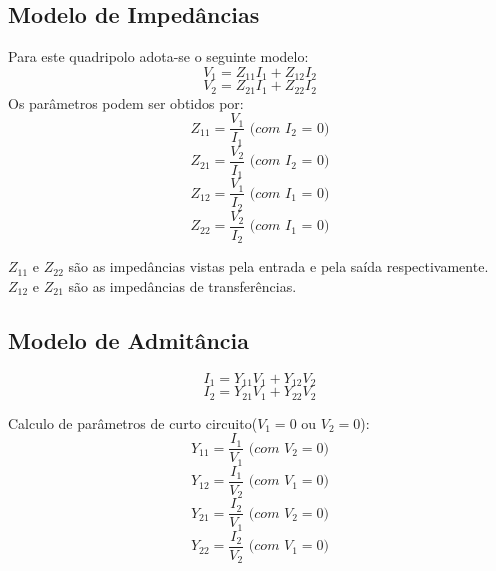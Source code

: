 \documentclass[a4paper, 12pt]{article}
\begin{document}
	\subsection{Modelo de Impedâncias}
	Para este quadripolo adota-se o seguinte modelo:
	\begin{equation}
		V_1 = Z_{11}I_1 + Z_{12}I_2
		\label{quadmod1}
	\end{equation}
	\begin{equation}
		V_2 = Z_{21}I_1 + Z_{22}I_2
		\label{quadmod2}
	\end{equation}
	Os parâmetros podem ser obtidos por:
	\begin{equation}
		Z_{11} = \frac{V_1}{I_1} \textit{ (com $I_2$ = 0)}
	\end{equation}
	\begin{equation}
		Z_{21} = \frac{V_2}{I_1} \textit{ (com $I_2$ = 0)}
	\end{equation}
	\begin{equation}
		Z_{12} = \frac{V_1}{I_2} \textit{ (com $I_1$ = 0)}
	\end{equation}
	\begin{equation}
		Z_{22} = \frac{V_2}{I_2} \textit{ (com $I_1$ = 0)}
	\end{equation}

	$Z_{11}$ e $Z_{22}$ são as impedâncias vistas pela entrada e pela saída respectivamente.\\
	$Z_{12}$ e $Z_{21}$ são as impedâncias de transferências.
	
	\subsection{Modelo de Admitância}
	\begin{equation}
		I_1 = Y_{11}V_1 + Y_{12}V_2
	\end{equation}
	\begin{equation}
		I_2 = Y_{21}V_1 + Y_{22}V_2
	\end{equation}

	Calculo de parâmetros de curto circuito($V_1 = 0$ ou $V_2 = 0$):
	\begin{equation}
		Y_{11} = \frac{I_1}{V_1} \textit{ (com $V_2 = 0$)}
	\end{equation}
	\begin{equation}
		Y_{12} = \frac{I_1}{V_2} \textit{ (com $V_1 = 0$)}
	\end{equation}
	\begin{equation}
		Y_{21} = \frac{I_2}{V_1} \textit{ (com $V_2 = 0$)}
	\end{equation}
	\begin{equation}
		Y_{22} = \frac{I_2}{V_2} \textit{ (com $V_1 = 0$)}
	\end{equation}
\end{document}
